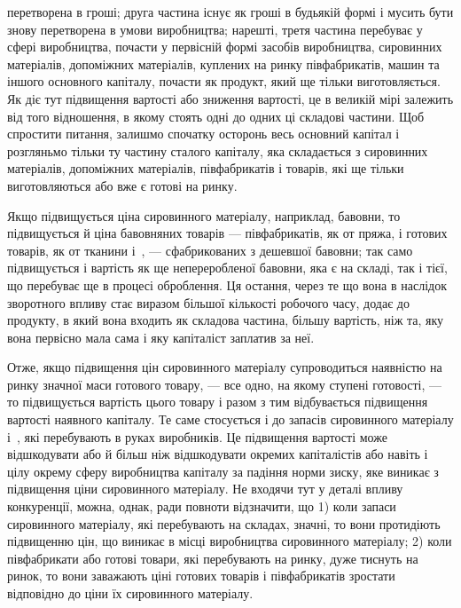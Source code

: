 \parcont{}  %
перетворена в гроші; друга частина існує як гроші в будьякій
формі і мусить бути знову перетворена в умови виробництва;
нарешті, третя частина перебуває у сфері виробництва, почасти
у первісній формі засобів виробництва, сировинних матеріалів,
допоміжних матеріалів, куплених на ринку півфабрикатів,
машин та іншого основного капіталу, почасти як продукт, який
ще тільки виготовляється. Як діє тут підвищення вартості або
зниження вартості, це в великій мірі залежить від того відношення,
в якому стоять одні до одних ці складові частини. Щоб
спростити питання, залишмо спочатку осторонь весь основний
капітал і розгляньмо тільки ту частину сталого капіталу, яка
складається з сировинних матеріалів, допоміжних матеріалів,
півфабрикатів і товарів, які ще тільки виготовляються або вже
є готові на ринку.

Якщо підвищується ціна сировинного матеріалу, наприклад,
бавовни, то підвищується й ціна бавовняних товарів — півфабрикатів,
як от пряжа, і готових товарів, як от тканини і~, —
сфабрикованих з дешевшої бавовни; так само підвищується
і вартість як ще непереробленої бавовни, яка є на складі, так
і тієї, що перебуває ще в процесі оброблення. Ця остання,
через те що вона в наслідок зворотного впливу стає виразом
більшої кількості робочого часу, додає до продукту, в який
вона входить як складова частина, більшу вартість, ніж та, яку
вона первісно мала сама і яку капіталіст заплатив за неї.

Отже, якщо підвищення цін сировинного матеріалу супроводиться
наявністю на ринку значної маси готового товару, —
все одно, на якому ступені готовості, — то підвищується вартість
цього товару і разом з тим відбувається підвищення вартості
наявного капіталу. Те саме стосується і до запасів сировинного
матеріалу і~, які перебувають в руках виробників.
Це підвищення вартості може відшкодувати або й більш ніж
відшкодувати окремих капіталістів або навіть і цілу окрему
сферу виробництва капіталу за падіння норми зиску, яке виникає
з підвищення ціни сировинного матеріалу. Не входячи тут
у деталі впливу конкуренції, можна, однак, ради повноти відзначити,
що 1) коли запаси сировинного матеріалу, які перебувають
на складах, значні, то вони протидіють підвищенню цін,
що виникає в місці виробництва сировинного матеріалу; 2) коли
півфабрикати або готові товари, які перебувають на ринку, дуже
тиснуть на ринок, то вони заважають ціні готових товарів і півфабрикатів
зростати відповідно до ціни їх сировинного матеріалу.

